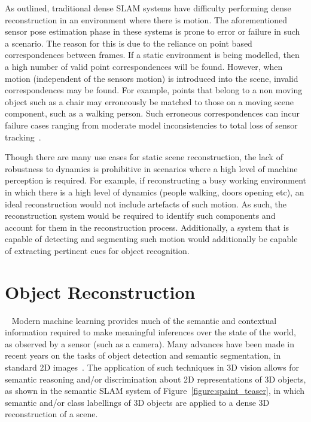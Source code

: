 As outlined, traditional dense SLAM systems have difficulty performing dense reconstruction in an 
environment where there is motion. The aforementioned sensor pose estimation phase in these systems
is prone to error or failure in such a scenario. The reason for this is due to the reliance on point based 
correspondences between frames. If a static environment is being modelled, then a high number of valid point 
correspondences will be found. However, when motion (independent of the sensors motion) is introduced into 
the scene, invalid correspondences may be found. For example, points that belong to a non moving object 
such as a chair may erroneously be matched to those on a moving scene component, such as a walking person.
Such erroneous correspondences can incur failure cases ranging from moderate model inconsistencies to total 
loss of sensor tracking~\cite{Newcombe2015}.

Though there are many use cases for static scene reconstruction, the lack of robustness to dynamics is 
prohibitive in scenarios where a high level of machine perception is required. For example, if 
reconstructing a busy working environment in which there is a high level of dynamics (people walking, 
doors opening etc), an ideal reconstruction would not include artefacts of such motion. As such, the 
reconstruction system would be required to identify such components and account for them in the 
reconstruction process. Additionally, a system that is capable of detecting and segmenting such motion 
would additionally be capable of extracting pertinent cues for object recognition.

\section{Object Reconstruction}
~\label{sec:intro_object_recon}
Modern machine learning provides much of the semantic and contextual information required to make meaningful 
inferences over the state of the world, as observed by a sensor (such as a camera). Many advances 
have been made in recent years on the tasks of object detection and semantic segmentation, in standard 2D 
images~\cite{Girshick2014,Shelhamer2017,Civera2011}. The application of such techniques in 3D vision allows 
for semantic reasoning and/or discrimination about 2D representations of 3D objects, as shown in the semantic 
SLAM system of Figure~\ref{figure:spaint_teaser}, in which semantic and/or class labellings of 3D objects are 
applied to a dense 3D reconstruction of a scene.

